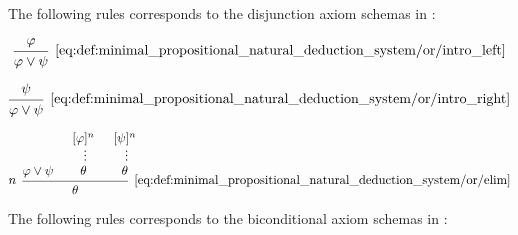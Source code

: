 \begin{definition}
\begin{thmenum}
     The following rules corresponds to the disjunction axiom schemas in :

    \begin{minipage}{0.3\textwidth}
      \begin{equation*}\taglabel[\( \vee_L^+ \)]{eq:def:minimal_propositional_natural_deduction_system/or/intro_left}
        \begin{prooftree}
          \hypo{ \varphi }
          \infer1[\ref{eq:def:minimal_propositional_natural_deduction_system/or/intro_left}]{ \varphi \vee \psi }
        \end{prooftree}
      \end{equation*}
    \end{minipage}
    \hfill
    \begin{minipage}{0.3\textwidth}
      \begin{equation*}\taglabel[\( \vee_R^+ \)]{eq:def:minimal_propositional_natural_deduction_system/or/intro_right}
        \begin{prooftree}
          \hypo{ \psi }
          \infer1[\ref{eq:def:minimal_propositional_natural_deduction_system/or/intro_right}]{ \varphi \vee \psi }
        \end{prooftree}
      \end{equation*}
    \end{minipage}
    \hfill
    \begin{minipage}{0.3\textwidth}
      \begin{equation*}\taglabel[\( \vee^- \)]{eq:def:minimal_propositional_natural_deduction_system/or/elim}
        \begin{prooftree}
          \hypo{ \varphi \vee \psi }
          \hypo{ [\varphi]^n }
          \ellipsis {} { \theta }
          \hypo{ [\psi]^n }
          \ellipsis {} { \theta }
          \infer[left label=\( n \)]3[\ref{eq:def:minimal_propositional_natural_deduction_system/or/elim}]{ \theta }
        \end{prooftree}
      \end{equation*}
    \end{minipage}

     The following rules corresponds to the biconditional axiom schemas in :


\end{thmenum}
\end{definition}
